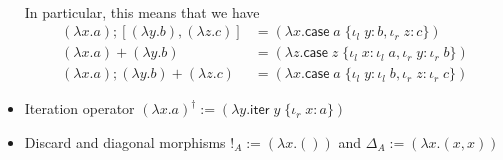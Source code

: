 \documentclass[acmsmall,screen,review]{acmart}
\newcommand{\ms}[1]{\ensuremath{\mathsf{#1}}}
\newcommand{\lto}{:}
\newcommand{\linl}[1]{\iota_l\;{#1}}
\newcommand{\linr}[1]{\iota_r\;{#1}}
\newcommand{\caseexpr}[5]{\ms{case}\;#1\;\{\linl{#2} \lto #3, \linr{#4} \lto #5\}}
\newcommand{\liter}[3]{\ms{iter}\;#1\;\{ \linr{#2} \lto #3 \}}
\begin{document}
\begin{itemize}
\begin{gather*}
  \end{gather*}
  In particular, this means that we have
  \begin{align*}
    (\lambda x . a) ; [(\lambda y . b), (\lambda z . c)]
      &= (\lambda x . \caseexpr{a}{y}{b}{z}{c})
      \\
    (\lambda x . a) + (\lambda y . b) &= (\lambda z. \caseexpr{z}{x}{\linl{a}}{y}{\linr{b}})
      \\
    (\lambda x . a) ; (\lambda y . b) + (\lambda z . c)
      &= (\lambda x . \caseexpr{a}{y}{\linl{b}}{z}{\linr{c}})
  \end{align*}
  \item Iteration operator
  $
    (\lambda x. a)^\dagger := (\lambda y. \liter{y}{x}{a})
  $
  \item Discard and diagonal morphisms $!_A := (\lambda x. ())$ and $\Delta_A := (\lambda x. (x,
  x))$
\end{itemize}
\end{document}
